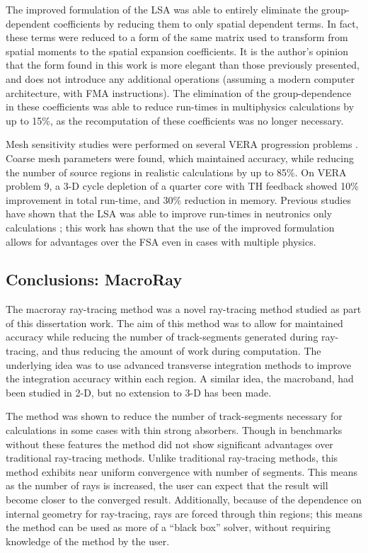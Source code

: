 {{{      The improved formulation of the \ac{LSA} was able to entirely eliminate the group-dependent coefficients by reducing them to only spatial dependent terms.
      In fact, these terms were reduced to a form of the same matrix used to transform from spatial moments to the spatial expansion coefficients.
      It is the author's opinion that the form found in this work is more elegant than those previously presented, and does not introduce any additional operations (assuming a modern computer architecture, with \acf{FMA} instructions).
      The elimination of the group-dependence in these coefficients was able to reduce run-times in multiphysics calculations by up to 15\%, as the recomputation of these coefficients was no longer necessary.

      Mesh sensitivity studies were performed on several \ac{VERA} progression problems \cite{VERAProblems}.
      Coarse mesh parameters were found, which maintained accuracy, while reducing the number of source regions in realistic calculations by up to 85\%.
      On \ac{VERA} problem 9, a 3-D cycle depletion of a quarter core with \ac{TH} feedback showed 10\% improvement in total run-time, and 30\% reduction in memory.
      Previous studies have shown that the \ac{LSA} was able to improve run-times in neutronics only calculations \cite{Ferrer2016,Gunow2018};
      this work has shown that the use of the improved formulation allows for advantages over the \ac{FSA} even in cases with multiple physics.
    }

    \subsection{Conclusions: MacroRay}{\label{ssec:Conclusions:MacroRay}
      The macroray ray-tracing method was a novel ray-tracing method studied as part of this dissertation work.
      The aim of this method was to allow for maintained accuracy while reducing the number of track-segments generated during ray-tracing, and thus reducing the amount of work during computation.
      The underlying idea was to use advanced transverse integration methods to improve the integration accuracy within each region.
      A similar idea, the macroband, had been studied in 2-D, but no extension to 3-D has been made.

      The method was shown to reduce the number of track-segments necessary for calculations in some cases with thin strong absorbers.
      Though in benchmarks without these features the method did not show significant advantages over traditional ray-tracing methods.
      Unlike traditional ray-tracing methods, this method exhibits near uniform convergence with number of segments.
      This means as the number of rays is increased, the user can expect that the result will become closer to the converged result.
      Additionally, because of the dependence on internal geometry for ray-tracing, rays are forced through thin regions;
        this means the method can be used as more of a ``black box'' solver, without requiring knowledge of the method by the user.
    }
  }

}
